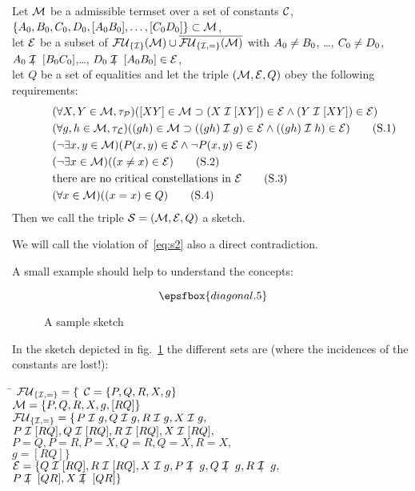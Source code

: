 \begin{definition}[Sketch] Let $\cM$ be a admissible termset
over a set of constants $\cC$, $\{\ao,\bo,\co,\deo,
[\ao\bo],\dots,[\co\deo]\}\subset\cM$,\\
let $\cE$ be a subset of
 $\fu_{\{\cI\}}(\cM) \cup \overline{\fu_{\{\cI,=\}}(\cM)}$
with $A_0\not=B_0$, \ldots,
 $C_0\not=D_0$, $\ao\notcI[\bo\co]$,\ldots, $\deo\notcI[\ao\bo]\in\cE$,\\
let $Q$ be a set of equalities and let the triple
$(\cM,\cE,Q)$ obey the following requirements:
\begin{align}
\qquad & (\forall X,Y\in\cM,\typpo)([XY]\in\cM\limp(X\cI[XY])\in\cE
                                \land (Y\cI[XY])\in\cE)\notag\\
 & (\forall g,h\in\cM,\typli)((gh)\in\cM\limp((gh)\cI g)\in\cE\land
                                    ((gh)\cI h)\in\cE)
                        \label{eq:s1}\tag{S.1}\\
 & (\lnot\exists x,y\in\cM)(P(x,y)\in\cE \land
 \lnot P(x,y)\in\cE)\notag\\
 & (\lnot\exists x\in\cM)((x\not=x)\in\cE)
                \label{eq:s2}\tag{S.2}\\
 & \text{there are no critical constellations in $\cE$}
                 \label{eq:s3}\tag{S.3}\\
 & (\forall x\in\cM)((x=x)\in Q) \label{eq:s4}\tag{S.4}
\end{align}
Then we call the triple $\cS=(\cM,\cE,Q)$ a sketch.
\end{definition}

We will call the violation of~\ref{eq:s2} also a direct
contradiction.

A small example should help to understand the concepts:

\begin{figure}[ht]
  \[\epsfbox{diagonal.5}\]
  \caption{A sample sketch}
  \label{skizze:sample-sketch}
\end{figure}

In the sketch depicted in fig.~\ref{skizze:sample-sketch} the
different sets are (where the incidences of the constants are lost!): 
\begin{tabbing}
        \qquad\= $\fu_{\{\cI,=\}}=\{$\=\kill
        \> $\cC = \{P,Q,R,X,g\}$\\
        \> $\cM = \{P,Q,R,X,g,[RQ]\}$\\
        \> $\fu_{\{\cI,=\}}=\{$\>$P\cI g, Q\cI g, R\cI g, X\cI g,$\\
        \>            \>$P\cI[RQ], Q\cI[RQ], R\cI[RQ], X\cI[RQ],$\\
        \>            \>$P=Q, P=R, P=X, Q=R, Q=X, R=X,$\\
        \>            \>$g=[RQ]\}$\\
        \>$\cE = \{ Q\cI[RQ], R\cI[RQ], X\cI g, P\notcI g, Q\notcI g,
                           R\notcI g, $\\ 
        \> \qquad\qquad $ P\notcI[QR], X\notcI[QR]\}$
\end{tabbing}

